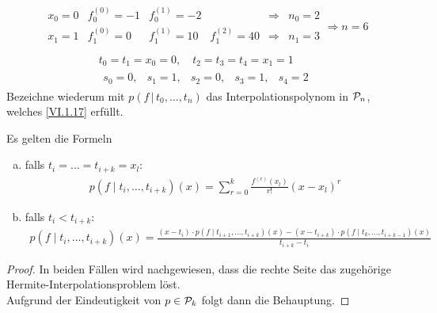 \begin{Bspe}\label{6.1.13}
  \begin{align*}
    \begin{array}{ccccrc}
      x_0=0 & f_0^{(0)} = -1 & f_0^{(1)}= -2 
      && \Rightarrow & n_0=2 \\
      x_1=1 & f_1^{(0)} = 0 &  f_1^{(1)}= 10 & f_1^{(2)}=40               
                     &\Rightarrow & n_1=3 \\
    \end{array}\Longrightarrow n=6
  \end{align*}
  \begin{gather*}
    t_0 = t_1 =x_0=0, \quad t_2=t_3=t_4=x_1=1 \\
    \begin{array}{ccccc}
      s_0=0, & s_1=1, & s_2=0, & s_3=1, & s_4=2
    \end{array}
  \end{gather*}
  Bezeichne wiederum mit $p(f\,| \, t_0,\dots, t_n)$
  das Interpolationspolynom in $\mathcal{P}_n$,
  welches \eqref{VI.1.17} erfüllt.
\end{Bspe}

\begin{Leme}
  \label{6.1.14}
  Es gelten die Formeln
  \begin{enumerate}[a)]
  \item falls $t_i=\dots = t_{i+k}=x_l$:
    \begin{gather}
      p(f\mid  t_i,\dots, t_{i+k})(x) 
      = \sum_{r=0}^{k}\frac{f^{(r)}(x_l)}{r!}(x-x_l)^r
      \label{VI.1.19}
    \end{gather}
  \item falls $t_i<t_{i+k} $:
    \begin{gather}
      p(f\mid  t_i,\dots, t_{i+k})(x) 
      = \frac{(x-t_i)\cdot p(f\mid  t_{i+1},\dots, t_{i+k})(x)
        - (x-t_{i+k})\cdot p(f\mid t_k,\dots, t_{i+k-1})(x)}
      {t_{i+k}-t_i}
      \label{VI.1.20}
    \end{gather}
  \end{enumerate}
\end{Leme}

\begin{proof}
  In beiden Fällen wird nachgewiesen, dass die rechte Seite
  das zugehörige Hermite-Interpolationsproblem löst.\\
  Aufgrund der Eindeutigkeit von $p\in\mathcal{P}_k$
  folgt dann die Behauptung.
\end{proof}


